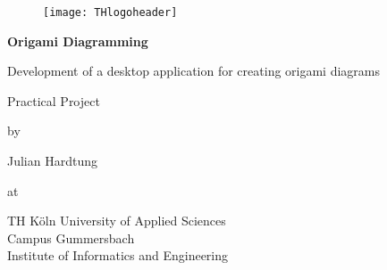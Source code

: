 
\begin{titlepage}
	\begin{center}
	
		\begin{figure}[!htbp]
			\texttt{[image: THlogoheader]}
		\end{figure}
		
		\vspace{0.8cm}
		
		\begin{rmfamily}
			\begin{huge}
				\textbf{Origami Diagramming}\\
			\end{huge}
			\vspace{0.5cm}
			\begin{LARGE}
				Development of a desktop application for creating 
				origami diagrams\\
			\end{LARGE}
		\end{rmfamily}
		
		\vspace{1.5cm}
		
		\begin{LARGE}
			\begin{scshape}
				Practical Project\\[0.8em]
			\end{scshape}
		\end{LARGE}
		
		\begin{large}
			by\\
			\begin{LARGE}
				Julian Hardtung\\
			\end{LARGE}
		\end{large}
		
		\vfill
		
		\begin{large}
			at\\
			\vspace{0.2cm}
			\begin{scshape}
				TH Köln University of Applied Sciences\\
				Campus Gummersbach\\
				Institute of Informatics and Engineering
			\end{scshape}
		\end{large}
		

\end{center}
\end{titlepage}

